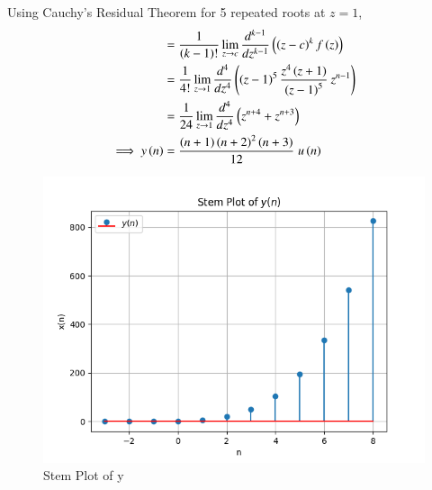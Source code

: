 \documentclass[journal,12pt,twocolumn]{IEEEtran}
\theoremstyle{remark}
\begin{document}
Using Cauchy's Residual Theorem for 5 repeated roots at $z=1$,
\begin{align}
    &=\frac{1}{\left(k-1\right)!} \lim_{z\to c}\frac{d^{k-1}}{dz^{k-1}}\left(\left(z-c\right)^kf\left(z\right)\right)\\
    &=\frac{1}{4!}\lim_{z\to1}\frac{d^4}{dz^4}\left(\left(z-1\right)^5\frac{z^4\left(z+1\right)}{\left(z-1\right)^5}\:z^{n-1}\right)\\
    &=\frac{1}{24}\lim_{z\to1}\frac{d^4}{dz^4}\left(z^{n+4}+z^{n+3}\right)\\
    \implies y\left(n\right)&=\frac{\left(n+1\right)\left(n+2\right)^2\left(n+3\right)}{12}\;u\left(n\right)
\end{align}
\begin{figure}[h!]
    \centering
    \includegraphics[width=1\linewidth]{figs/Figure_1.png}
    \caption{Stem Plot of y}
\end{figure}
\end{document}
